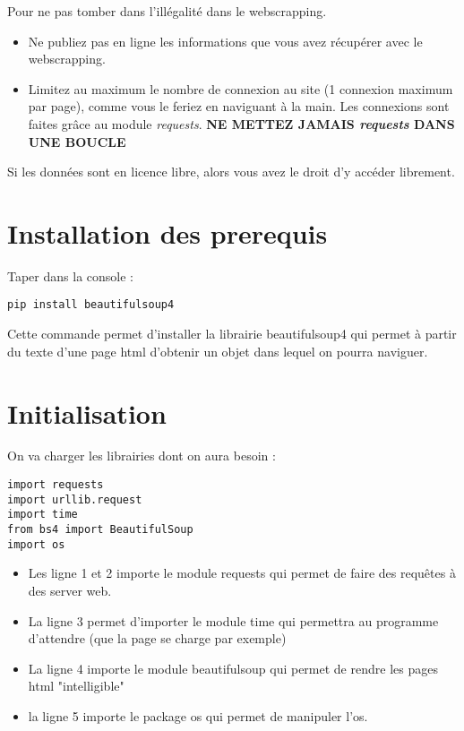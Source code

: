 \documentclass[12pt,fleqn]{article} %
\begin{document}
Pour ne pas tomber dans l'illégalité dans le webscrapping.
\begin{itemize}
	\item Ne publiez pas en ligne les informations que vous avez récupérer avec le webscrapping.
	\item Limitez au maximum le nombre de connexion au site (1 connexion maximum par page), comme vous le feriez en naviguant à la main. Les connexions sont faites grâce au module \textit{requests}. \textbf{NE METTEZ JAMAIS \textit{requests} DANS UNE BOUCLE}
\end{itemize}
Si les données sont en licence libre, alors vous avez le droit d'y accéder librement.



\section{Installation des prerequis}

Taper dans la console : 
\begin{center}
	\begin{varwidth}[t]{.5\textwidth}
		\begin{lstlisting}[language=iPython,linewidth = 10cm]
pip install beautifulsoup4
\end{lstlisting}\end{varwidth}\end{center}

Cette commande permet d'installer la librairie beautifulsoup4 qui permet à partir du texte d'une page html d'obtenir un objet dans lequel on pourra naviguer.


\section{Initialisation}\label{initialisation}

On va charger les librairies dont on aura besoin : 
\begin{center}
	\begin{varwidth}[t]{.5\textwidth}
		\begin{lstlisting}[language=iPython,linewidth = 10cm]
import requests
import urllib.request
import time
from bs4 import BeautifulSoup
import os
\end{lstlisting}\end{varwidth}\end{center}
\begin{itemize}
	\item Les ligne 1 et 2  importe le module requests qui permet de faire des requêtes à des server web.
	\item La ligne 3 permet d'importer le module time qui permettra au programme d'attendre (que la page se charge par exemple)
	\item La ligne 4 importe le module beautifulsoup qui permet de rendre les pages html "intelligible"
	\item la ligne 5 importe le package os qui permet de manipuler l'os.
\end{itemize}
\end{document}
